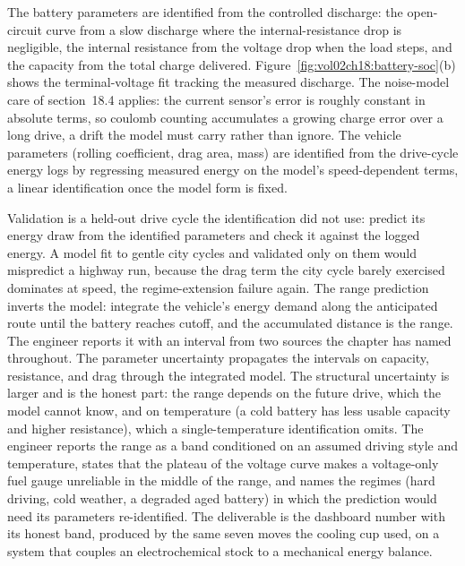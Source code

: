  The battery
parameters are identified from the controlled discharge: the open-circuit
curve from a slow discharge where the internal-resistance drop is
negligible, the internal resistance from the voltage drop when the load
steps, and the capacity from the total charge delivered.
Figure~\ref{fig:vol02ch18:battery-soc}(b) shows the terminal-voltage fit
tracking the measured discharge. The noise-model care of section~18.4
applies: the current sensor's error is roughly constant in absolute terms,
so coulomb counting accumulates a growing charge error over a long drive, a
drift the model must carry rather than ignore. The vehicle parameters
(rolling coefficient, drag area, mass) are identified from the drive-cycle
energy logs by regressing measured energy on the model's speed-dependent
terms, a linear identification once the model form is fixed.



 Validation is a held-out drive
cycle the identification did not use: predict its energy draw from the
identified parameters and check it against the logged energy. A model fit to
gentle city cycles and validated only on them would mispredict a highway
run, because the drag term the city cycle barely exercised dominates at
speed, the regime-extension failure again. The range prediction inverts the
model: integrate the vehicle's energy demand along the anticipated route
until the battery reaches cutoff, and the accumulated distance is the range.
The engineer reports it with an interval from two sources the chapter has
named throughout. The parameter uncertainty propagates the intervals on
capacity, resistance, and drag through the integrated model. The structural
uncertainty is larger and is the honest part: the range depends on the
future drive, which the model cannot know, and on temperature (a cold
battery has less usable capacity and higher resistance), which a
single-temperature identification omits. The engineer reports the range as a
band conditioned on an assumed driving style and temperature, states that
the plateau of the voltage curve makes a voltage-only fuel gauge unreliable
in the middle of the range, and names the regimes (hard driving, cold
weather, a degraded aged battery) in which the prediction would need its
parameters re-identified. The deliverable is the dashboard number with its
honest band, produced by the same seven moves the cooling cup used, on a
system that couples an electrochemical stock to a mechanical energy balance.

